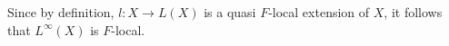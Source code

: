 \begin{rmk}
Since by definition, $l:X\to L(X)$ is a quasi $F$-local extension of $X$, it follows that $L^\infty(X)$ is $F$-local.
\end{rmk}

\begin{comment}
\begin{lem}
Let $X$ be a type and let $f:P(a)\to X$. Then we have an equivalence
\begin{equation*}
\eqv{\hfib{\psi_{L^\infty(X)}}{\iota_0\circ f}}{\tfcolim_n(\hfib{\psi_{L^n(X)}}{l^n\circ f})}.
\end{equation*}
\end{lem}

\begin{proof}
This follows from a simple calculation using the facts about sequentially compact
types of the previous section:
\begin{align*}
\hfib{\psi_{L^\infty(X)}}{\iota_0\circ f}
  & \jdeq
\sm{g:Q(a)\to L^\infty(X)} \id{g\circ F(a)}{\iota_0\circ f} \\
& \eqvsym \sm{g:\tfcolim_n(Q(a)\to L^n(X)} \id{\xi_{Q(a)}(g)\circ F(a)}{\iota_0\circ f}) \\
& \eqvsym \tfcolim_n(\sm{g:Q(a)\to L^n(X)} \id{\iota_n\circ g\circ F(a)}{\iota_0\circ f}) \\
& \eqvsym \tfcolim_n(\sm{g:Q(a)\to L^n(X)} \prd{u:P(a)}\id{\iota_n(g(F(a,u)))}{\iota_0(f(u))} \\
& \eqvsym \tfcolim_n(\sm{g:Q(a)\to L^n(X)} \prd{u:P(a)}\tfcolim_m(\id{\iota_{n+m}(g(F(a,u)))}{\iota_{n+m}(l^{n+m}(f(u)))}) \\
& \eqvsym \tfcolim_n(\sm{g:Q(a)\to L^n(X)} \tfcolim_m(\prd{u:P(a)}\id{\iota_{n+m}(g(F(a,u)))}{\iota_{n+m}(l^{n+m}(f(u)))}) \\
& \eqvsym \tfcolim_n(\sm{g:Q(a)\to L^n(X)} \id{g\circ F(a)}{l^n\circ f}) \\
& \jdeq \tfcolim_n(\hfib{\psi_{L^n(X)}}{l^n\circ f}).\qedhere
\end{align*}
\end{proof}
\end{comment}

\begin{comment}
\begin{cor}
For any $m:\nat$ and $f:P(a)\to L^m(X)$, we have an equivalence
\begin{equation*}
\eqv{\hfib{\psi_{L^\infty(X)}}{\iota_n\circ f}}{\tfcolim_{n\geq m}(\hfib{\psi_{L^n(X)}}{l^{n-m}\circ f})}.
\end{equation*}
\end{cor}
\end{comment}

